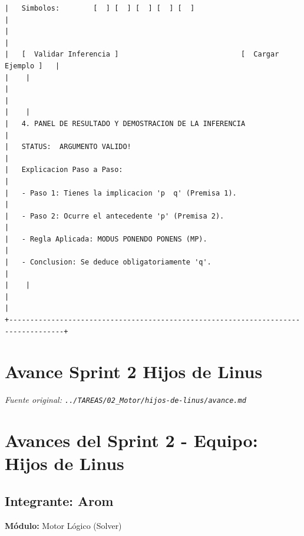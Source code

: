 \documentclass[11pt,a4paper,openany]{book}
\begin{document}
\begin{lstlisting}[language={},basicstyle=\ttfamily\scriptsize]
|   Simbolos:        [  ] [  ] [  ] [  ] [  ]                                |
|                                                                                 |
|   [  Validar Inferencia ]                             [  Cargar Ejemplo ]   |
|    |
|                                                                                   |
|    |
|   4. PANEL DE RESULTADO Y DEMOSTRACION DE LA INFERENCIA                         |
|   STATUS:  ARGUMENTO VALIDO!                                                 |
|   Explicacion Paso a Paso:                                                      |
|   - Paso 1: Tienes la implicacion 'p  q' (Premisa 1).                          |
|   - Paso 2: Ocurre el antecedente 'p' (Premisa 2).                              |
|   - Regla Aplicada: MODUS PONENDO PONENS (MP).                                  |
|   - Conclusion: Se deduce obligatoriamente 'q'.                                 |
|    |
|                                                                                   |
+-----------------------------------------------------------------------------------+
\end{lstlisting}


\section{Avance Sprint 2 Hijos de Linus}
\textit{Fuente original: \texttt{../TAREAS/02\_Motor/hijos-de-linus/avance.md}}

\section{Avances del Sprint 2 - Equipo: Hijos de Linus}

\subsection{Integrante: Arom}
\textbf{Módulo:} Motor Lógico (Solver)
\end{document}
